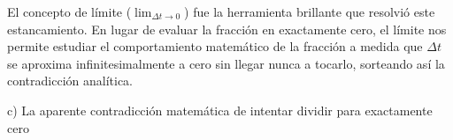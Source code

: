 \documentclass[12pt, a4paper]{article}
\begin{document}
El concepto de límite ($\lim_{\Delta t \to 0}$) fue la herramienta brillante que resolvió este estancamiento. En lugar de evaluar la fracción en exactamente cero, el límite nos permite estudiar el comportamiento matemático de la fracción a medida que $\Delta t$ se aproxima infinitesimalmente a cero sin llegar nunca a tocarlo, sorteando así la contradicción analítica.

\begin{tcolorbox}[colback=green!5!white, colframe=green!50!black, title=Respuesta Final]
\centering \Large c) La aparente contradicción matemática de intentar dividir para exactamente cero
\end{tcolorbox}
\end{document}
